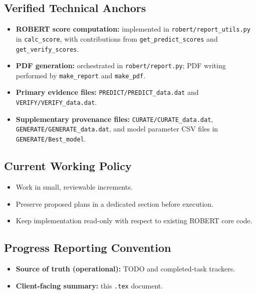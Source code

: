 \documentclass[11pt]{article}
\begin{document}
\subsection*{Verified Technical Anchors}
\begin{itemize}
    \item \textbf{ROBERT score computation:} implemented in \texttt{robert/report\_utils.py} in \texttt{calc\_score}, with contributions from \texttt{get\_predict\_scores} and \texttt{get\_verify\_scores}.
    \item \textbf{PDF generation:} orchestrated in \texttt{robert/report.py}; PDF writing performed by \texttt{make\_report} and \texttt{make\_pdf}.
    \item \textbf{Primary evidence files:} \texttt{PREDICT/PREDICT\_data.dat} and \texttt{VERIFY/VERIFY\_data.dat}.
    \item \textbf{Supplementary provenance files:} \texttt{CURATE/CURATE\_data.dat}, \texttt{GENERATE/GENERATE\_data.dat}, and model parameter CSV files in \texttt{GENERATE/Best\_model}.
\end{itemize}

\subsection*{Current Working Policy}
\begin{itemize}
    \item Work in small, reviewable increments.
    \item Preserve proposed plans in a dedicated section before execution.
    \item Keep implementation read-only with respect to existing ROBERT core code.
\end{itemize}

\subsection*{Progress Reporting Convention}
\begin{itemize}
    \item \textbf{Source of truth (operational):} TODO and completed-task trackers.
    \item \textbf{Client-facing summary:} this \texttt{.tex} document.
\end{itemize}
\end{document}
